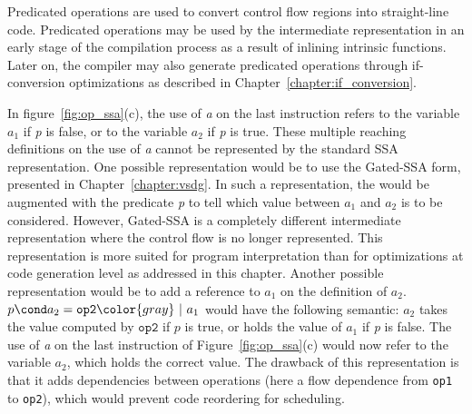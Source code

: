 
Predicated operations are used to convert control flow regions into
straight-line code. Predicated operations may be used by the intermediate
representation in an early stage of the compilation process as a result of inlining intrinsic functions. Later on, the compiler may
also generate predicated operations through if-conversion optimizations
as described in Chapter~\ref{chapter:if_conversion}.


In figure~\ref{fig:op_ssa}(c), the use of \textit{a} on the last
instruction refers to the variable ${a_1}$ if \textit{p} is false, or
to the variable ${a_2}$ if \textit{p} is true. These multiple
reaching definitions on the use of \textit{a} cannot be represented by
the standard SSA representation.
%
One possible representation would be to use the Gated-SSA form,
presented in Chapter~\ref{chapter:vsdg}. In such a representation, the
\phifun would be augmented with the predicate \textit{p} to tell
which value between ${a_1}$ and ${a_2}$ is to be
considered. However, Gated-SSA is a completely different intermediate
representation where the control flow is no longer represented. This
representation is more suited for program interpretation than for optimizations at code generation level as addressed in this chapter.
%
Another possible representation would be to add a reference to ${a_1}$
 on the definition of ${a_2}$. $p\cond a_2=\texttt{op2} {\color{gray}~|~a_1}$ 
would have the following semantic: ${a_2}$ takes the value computed by $\texttt{op2}$ if $p$ is true, or holds
the value of ${a_1}$ if \textit{p} is {false}. The use of \textit{a} on the last instruction of Figure~\ref{fig:op_ssa}(c)
would now refer to the variable ${a_2}$, which holds the correct
value. The drawback of this representation is that it adds
dependencies between operations (here a flow dependence from \texttt{op1} to \texttt{op2}), which would prevent code reordering
for scheduling.

